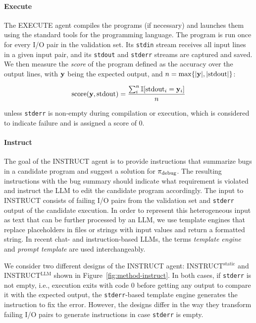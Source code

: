 \paragraph{Execute}

The EXECUTE agent compiles the programs (if necessary) and launches them using the standard tools for the programming language.
The program is run once for every I/O pair in the validation set. 
Its \texttt{stdin} stream receives all input lines in a given input pair, and its \texttt{stdout} and \texttt{stderr} streams are captured and saved.
We then measure the \emph{score} of the program defined as the accuracy over the output lines, with $\mathbf{y}{}$ being the expected output, and $n=\max\{|\mathbf{y}{}|, |\text{stdout}|\}$:

\begin{equation}
    \text{score}(\mathbf{y}{}, \text{stdout}) = \frac{\sum^{n}_i{\mathbb{I} [\text{stdout}_i = \mathbf{y}_i]}}{n} 
\end{equation}

unless \texttt{stderr} is non-empty during compilation or execution, which is considered to indicate failure and is assigned a score of 0.

\paragraph{Instruct}

The goal of the INSTRUCT agent is to provide instructions that summarize bugs in a candidate program and suggest a solution for $ \pi_\text{debug} $. 
The resulting instructions with the bug summary should indicate what requirement is violated and instruct the LLM to edit the candidate program accordingly. 
The input to INSTRUCT consists of failing I/O pairs from the validation set and \texttt{stderr} output of the candidate execution. 
In order to represent this heterogeneous input as text that can be further processed by an LLM, we use template engines that replace placeholders in files or strings with input values and return a formatted string. 
In recent chat- and instruction-based LLMs, the terms \emph{template engine} and \emph{prompt template} are used interchangeably.

We consider two different designs of the INSTRUCT agent: INSTRUCT$^{\text{static}}$ and INSTRUCT$^{\text{LLM}}$ shown in Figure~\ref{fig:method-instruct}. 
In both cases, if \texttt{stderr} is not empty, i.e., execution exits with code 0 before getting any output to compare it with the expected output, the \texttt{stderr}-based template engine generates the instruction to fix the error. 
However, the designs differ in the way they transform failing I/O pairs to generate instructions in case \texttt{stderr} is empty.

